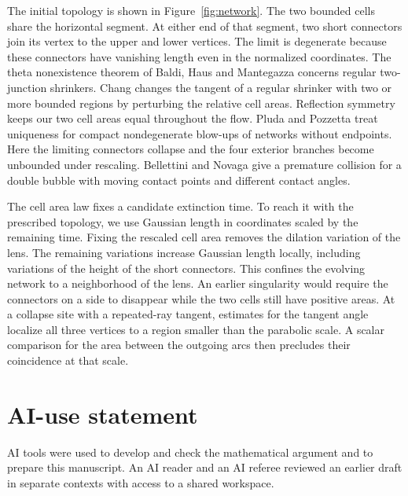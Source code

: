 \documentclass[11pt,reqno]{amsart}
\begin{document}
The initial topology is shown in Figure~\ref{fig:network}. The two
bounded cells share the horizontal segment. At either end of that
segment, two short connectors join its vertex to the upper and lower
vertices. The limit is degenerate because these connectors have
vanishing length even in the normalized coordinates. The theta
nonexistence theorem of Baldi, Haus and Mantegazza \cite{theta}
concerns regular two-junction shrinkers. Chang \cite[Theorem~1.3]{chang}
changes the tangent of a regular shrinker with two or more bounded
regions by perturbing the relative cell areas. Reflection symmetry keeps
our two cell areas equal throughout the flow.
Pluda and Pozzetta \cite[Theorem~1.1]{pp} treat uniqueness for compact
nondegenerate blow-ups of networks without endpoints. Here the limiting
connectors collapse and the four exterior branches become unbounded
under rescaling. Bellettini and Novaga \cite[\S6.2]{bn} give a
premature collision for a double bubble with moving contact points
and different contact angles.

The cell area law fixes a candidate extinction time. To reach it with
the prescribed topology, we use Gaussian length in coordinates scaled
by the remaining time. Fixing the rescaled cell area removes the
dilation variation of the lens. The remaining variations increase
Gaussian length locally, including variations of the height of the
short connectors. This confines the evolving network to a neighborhood
of the lens. An earlier singularity would require the connectors on a
side to disappear while the two cells still have positive areas.
At a collapse site with a repeated-ray tangent, estimates for the tangent
angle localize all three vertices to a region smaller than the
parabolic scale. A scalar comparison for the area between the outgoing
arcs then precludes their coincidence at that scale.



\section*{AI-use statement}
AI tools were used to develop and check the mathematical argument and
to prepare this manuscript. An AI reader and an AI referee reviewed an
earlier draft in separate contexts with access to a shared workspace.
\end{document}
